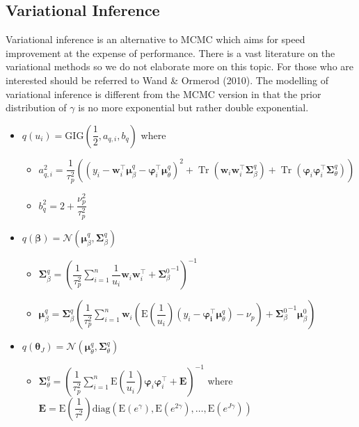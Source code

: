 \documentclass[12pt]{article}
\newcommand{\bs}{\boldsymbol}
\DeclareMathOperator{\Tr}{Tr}
\begin{document}
\subsection{Variational Inference}
  Variational inference is an alternative to MCMC which aims for speed improvement at the expense of performance. There is a vast literature on the variational methods so we do not elaborate more on this topic. For those who are interested should be referred to Wand \& Ormerod (2010). The modelling of variational inference is different from the MCMC version in that the prior distribution of $\gamma$ is no more exponential but rather double exponential. 
\begin{itemize}
  \item $q\left(u_{i}\right) = \mathrm{GIG}\left(\dfrac{1}{2}, a_{q,i}, b_{q}\right)$ where
  \begin{itemize}
    \item $a_{q,i}^{2}= \dfrac{1}{\tau_{p}^{2}}\left(\left(y_{i}-\bs{w}_{i}^{\top}\bs{\mu}_{\beta}^{q}-\bs{\varphi}_{i}^{\top}\bs{\mu}_{\theta}^{q}\right)^{2}+\Tr\left(\bs{w}_{i}\bs{w}_{i}^{\top}\bs{\Sigma}_{\beta}^{q}\right)+\Tr\left(\bs{\varphi}_{i}\bs{\varphi}_{i}^{\top}\bs{\Sigma}_{\theta}^{q}\right) \right) $
    \item $b_{q}^{2}=2 + \dfrac{\nu_{p}^{2}}{\tau_{p}^{2}}$
  \end{itemize}
  \item $q\left(\bs{\beta}\right)=\mathcal{N}\left(\bs{\mu}_{\beta}^{q},\bs{\Sigma}_{\beta}^{q}\right)$
  \begin{itemize}
    \item $\bs{\Sigma}_{\beta}^{q}= \left(\dfrac{1}{\tau_{p}^{2}}\displaystyle \sum_{i=1}^{n}\dfrac{1}{u_{i}}\bs{w}_{i}\bs{w}_{i}^{\top}+{\bs{\Sigma}_{\beta}^{0}}^{-1}\right)^{-1} $
    \item $\bs{\mu}_{\beta}^{q} = \bs{\Sigma}_{\beta}^{q}\left(\dfrac{1}{\tau_{p}^{2}}\displaystyle \sum_{i=1}^{n}\bs{w}_{i}\left(\mathrm{E}\left(\dfrac{1}{u_{i}}\right)\left(y_{i}-\bs{\varphi_{i}^{\top}}\bs{\mu}_{\theta}^{q}\right)-\nu_{p}\right)+{\bs{\Sigma}_{\beta}^{0}}^{-1}\bs{\mu}_{\beta}^{0} \right) $
  \end{itemize}
  \item $q\left(\bs{\theta}_{J}\right)=\mathcal{N}\left(\bs{\mu}_{\theta}^{q},\bs{\Sigma}_{\theta}^{q}\right)$
  \begin{itemize}
    \item $\bs{\Sigma}_{\theta}^{q}=\left(\dfrac{1}{\tau_{p}^{2}}\displaystyle \sum_{i=1}^{n}\mathrm{E}\left(\dfrac{1}{u_{i}}\right)\bs{\varphi}_{i}\bs{\varphi}_{i}^{\top}+\bs{E} \right)^{-1}$ where $\bs{E}=\mathrm{E}\left(\dfrac{1}{\tau^{2}}\right)\mathrm{diag}\left(\mathrm{E}\left(e^{\gamma}\right), \mathrm{E}\left(e^{2\gamma}\right),\ldots, \mathrm{E}\left(e^{J\gamma}\right) \right) $

\end{itemize}
\end{itemize}
\end{document}
